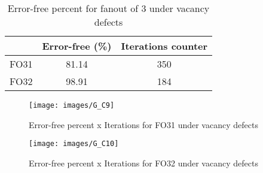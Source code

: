 \begin{table}[h]
\begin{center}
\caption{Error-free percent for fanout of 3 under vacancy defects}
\begin{tabular}{|c|c|c|}
\hline
 & Error-free (\%) & Iterations counter \\
\hline
 FO31 & 81.14 & 350 \\
\hline
 FO32 & 98.91 & 184 \\
\hline

\end{tabular}
\end{center}
\end{table}

\begin{figure}[h!]
\center
\texttt{[image: images/G\_C9]}
\caption{Error-free percent x Iterations for FO31 under vacancy defects}
\label{figure:fanout3_reg_gt5}
\end{figure}

\begin{figure}[h!]
\center
\texttt{[image: images/G\_C10]}
\caption{Error-free percent x Iterations for FO32 under vacancy defects}
\label{figure:fanout3_mod_gt5}
\end{figure}
\pagebreak